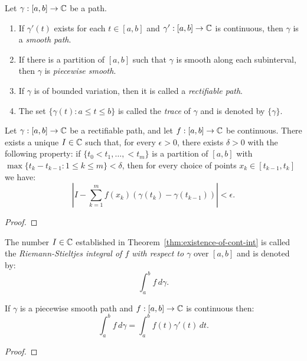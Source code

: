\documentclass[reqno]{amsart}
\begin{document}
\begin{definition}
	Let $\gamma:[a,b] \rightarrow \mathbb{C}$ be a path.
	\mbox{}
	\begin{enumerate}[label = (\arabic*),itemsep=1pt,topsep=3pt]
		\item If $\gamma'(t)$ exists for each $t \in [a,b]$ and $\gamma':[a,b] \rightarrow \mathbb{C}$ is continuous, then $\gamma$ is a \emph{smooth path}.
		\item If there is a partition of $[a,b]$ such that $\gamma$ is smooth along each subinterval, then $\gamma$ is \emph{piecewise smooth}.
		\item If $\gamma$ is of bounded variation, then it is called a \emph{rectifiable path}.
		\item The set $\{\gamma(t):a \leq t \leq b\}$ is called the \emph{trace} of $\gamma$ and is denoted by $\{\gamma\}$.
	\end{enumerate}
\end{definition}

\begin{theorem}\label{thm:existence-of-cont-int}
	Let $\gamma:[a,b] \rightarrow \mathbb{C}$ be a rectifiable path, and let $f:[a,b] \rightarrow \mathbb{C}$ be continuous. There exists a unique $I \in \mathbb{C}$ such that, for every $\epsilon > 0$, there exists $\delta > 0$ with the following property: if $\{t_0 < t_1,\ldots, <t_m\}$ is a partition of $[a,b]$ with $\max \{t_k - t_{k-1} : 1 \leq k \leq m \} < \delta$, then for every choice of points $x_k \in [t_{k-1},t_k]$ we have:
	\[
		\left| I - \sum_{k = 1}^{m}  f(x_k) \left( \gamma(t_k) - \gamma(t_{k-1}) \right)  \right| < \epsilon.
	\] 
\end{theorem}
{\color{red}
\begin{proof}
		
\end{proof}}

\begin{definition}
	The number $I \in \mathbb{C}$ established in Theorem~\ref{thm:existence-of-cont-int} is called the \emph{Riemann-Stieltjes integral of $f$ with respect to $\gamma$} over $[a,b]$ and is denoted by:
	\[
		\int_{a}^{b} f\,d\gamma.
	\] 
\end{definition}

\begin{theorem}
	If $\gamma$ is a piecewise smooth path and $f:[a,b] \rightarrow \mathbb{C}$ is continuous then:
	\[
		\int_{a}^{b} f\,d \gamma = \int_{a}^{b} f(t) \gamma'(t)\,dt.
	\] 
\end{theorem}
{\color{red}
\begin{proof}
		
\end{proof}}
\end{document}
